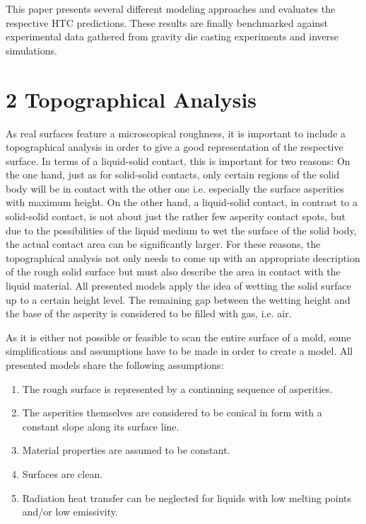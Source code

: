 \documentclass[10pt]{article}
\begin{document}
This paper presents several different modeling approaches and evaluates the respective HTC predictions. These results are finally benchmarked against experimental data gathered from gravity die casting experiments and inverse simulations.

\section*{2 Topographical Analysis}
As real surfaces feature a microscopical roughness, it is important to include a topographical analysis in order to give a good representation of the respective surface. In terms of a liquid-solid contact, this is important for two reasons: On the one hand, just as for solid-solid contacts, only certain regions of the solid body will be in contact with the other one i.e. especially the surface asperities with maximum height. On the other hand, a liquid-solid contact, in contrast to a solid-solid contact, is not about just the rather few asperity contact spots, but due to the possibilities of the liquid medium to wet the surface of the solid body, the actual contact area can be significantly larger. For these reasons, the topographical analysis not only needs to come up with an appropriate description of the rough solid surface but must also describe the area in contact with the liquid material. All presented models apply the idea of wetting the solid surface up to a certain height level. The remaining gap between the wetting height and the base of the asperity is considered to be filled with gas, i.e. air.

As it is either not possible or feasible to scan the entire surface of a mold, some simplifications and assumptions have to be made in order to create a model. All presented models share the following assumptions:

\begin{enumerate}
  \item The rough surface is represented by a continuing sequence of asperities.

  \item The asperities themselves are considered to be conical in form with a constant slope along its surface line.

  \item Material properties are assumed to be constant.

  \item Surfaces are clean.

  \item Radiation heat transfer can be neglected for liquids with low melting points and/or low emissivity.

\end{enumerate}
\end{document}
